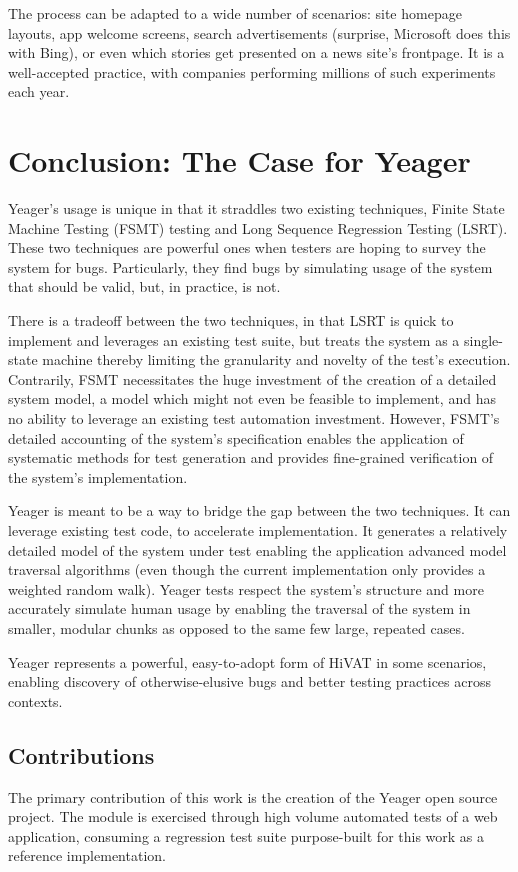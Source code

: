 The process can be adapted to a wide number of scenarios: site homepage layouts, app welcome screens, search advertisements (surprise, Microsoft does this with Bing), or even which stories get presented on a news site's frontpage. It is a well-accepted practice, with companies performing millions of such experiments each year. \citep{HBR2017ABTest}

\chapter{Conclusion: The Case for Yeager}
Yeager's usage is unique in that it straddles two existing techniques, Finite State Machine Testing (FSMT) testing and Long Sequence Regression Testing (LSRT). These two techniques are powerful ones when testers are hoping to survey the system for bugs. Particularly, they find bugs by simulating usage of the system that should be valid, but, in practice, is not.

There is a tradeoff between the two techniques, in that LSRT is quick to implement and leverages an existing test suite, but treats the system as a single-state machine thereby limiting the granularity and novelty of the test's execution. Contrarily, FSMT necessitates the huge investment of the creation of a detailed system model, a model which might not even be feasible to implement, and has no ability to leverage an existing test automation investment. However, FSMT's detailed accounting of the system's specification enables the application of systematic methods for test generation and provides fine-grained verification of the system's implementation.

Yeager is meant to be a way to bridge the gap between the two techniques. It can leverage existing test code, to accelerate implementation. It generates a relatively detailed model of the system under test enabling the application advanced model traversal algorithms (even though the current implementation only provides a weighted random walk). Yeager tests respect the system's structure and more accurately simulate human usage by enabling the traversal of the system in smaller, modular chunks as opposed to the same few large, repeated cases.

Yeager represents a powerful, easy-to-adopt form of HiVAT in some scenarios, enabling discovery of otherwise-elusive bugs and better testing practices across contexts.

\section{Contributions}
The primary contribution of this work is the creation of the Yeager open source project. The module is exercised through high volume automated tests of a web application, consuming a regression test suite purpose-built for this work as a reference implementation.

